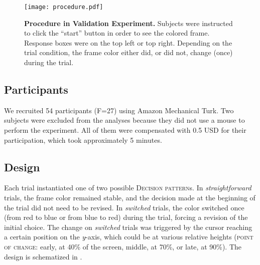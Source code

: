 \documentclass[11pt]{article}
\begin{document}
\begin{figure}[h]
\centering
\texttt{[image: procedure.pdf]}
\caption{\textbf{Procedure in Validation Experiment.} Subjects were instructed to click the ``start'' button in order to see the colored frame. Response boxes were on the top left or top right. Depending on the trial condition, the frame color either did, or did not, change (once) during the trial.} \label{fig:procedure.example}
\end{figure}

\subsection{Participants} We recruited 54 participants (F=27) using Amazon Mechanical Turk. Two subjects were excluded from the analyses because they did not use a mouse to perform the experiment. All of them were compensated with 0.5 USD for their participation, which took approximately 5 minutes. 

\subsection{Design}
Each trial instantiated one of two possible \textsc{Decision pattern}s. In \textit{straightforward} trials, the frame color remained stable, and the decision made at the beginning of the trial did not need to be revised. In \textit{switched} trials, the color switched once (from red to blue or from blue to red) during the trial, forcing a revision of the initial choice. 
The change on \textit{switched} trials was triggered by the cursor reaching a certain position on the \textit{y}-axis, which could be at various relative heights (\textsc{point of change}: early, at 40\% of the screen, middle, at 70\%, or late, at 90\%). 
The design is schematized in . 
\end{document}

